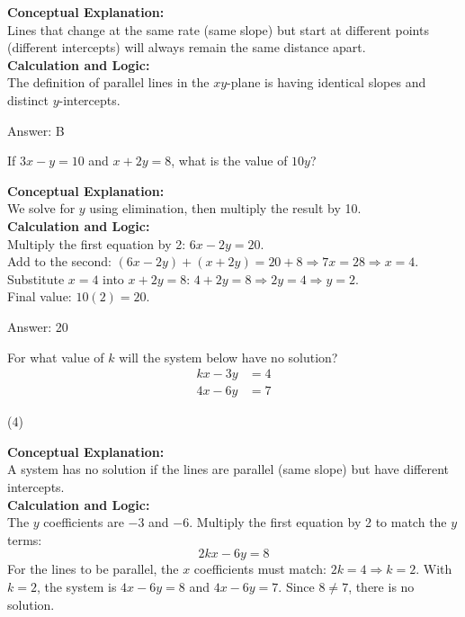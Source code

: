 \documentclass[11pt,paper=a4,answers]{exam}
\begin{document}
\begin{questions}
\begin{solution}
\textbf{Conceptual Explanation:} \\
Lines that change at the same rate (same slope) but start at different points (different intercepts) will always remain the same distance apart.
\\[10pt]
\textbf{Calculation and Logic:} \\
The definition of parallel lines in the $xy$-plane is having identical slopes and distinct $y$-intercepts.

\vspace{15pt}
Answer: \colorbox{yellow!100}{B}
\end{solution}


\question
If $3x - y = 10$ and $x + 2y = 8$, what is the value of $10y$?

\begin{solution}
\textbf{Conceptual Explanation:} \\
We solve for $y$ using elimination, then multiply the result by 10.
\\[10pt]
\textbf{Calculation and Logic:} \\
Multiply the first equation by 2: $6x - 2y = 20$. \\
Add to the second: $(6x - 2y) + (x + 2y) = 20 + 8 \Rightarrow 7x = 28 \Rightarrow x = 4$. \\
Substitute $x = 4$ into $x + 2y = 8$: $4 + 2y = 8 \Rightarrow 2y = 4 \Rightarrow y = 2$. \\
Final value: $10(2) = 20$.

\vspace{15pt}
Answer: \colorbox{yellow!100}{20}
\end{solution}



\question
For what value of $k$ will the system below have no solution?
\begin{align*}
kx - 3y &= 4 \\
4x - 6y &= 7
\end{align*}
\begin{tasks}(4)
\end{tasks}

\begin{solution}
\textbf{Conceptual Explanation:} \\
A system has no solution if the lines are parallel (same slope) but have different intercepts.
\\[10pt]
\textbf{Calculation and Logic:} \\
The $y$ coefficients are $-3$ and $-6$. Multiply the first equation by 2 to match the $y$ terms:
\[2kx - 6y = 8\]
For the lines to be parallel, the $x$ coefficients must match: $2k = 4 \Rightarrow k = 2$.
With $k=2$, the system is $4x - 6y = 8$ and $4x - 6y = 7$. Since $8 \neq 7$, there is no solution.


\end{solution}
\end{questions}
\end{document}
